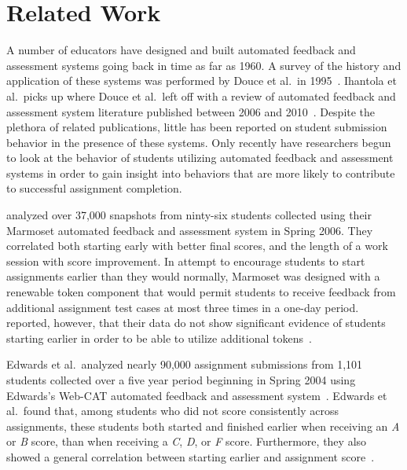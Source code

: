 \section{Related Work}

A number of educators have designed and built automated feedback and assessment
systems going back in time as far as 1960. A survey of the history and
application of these systems was performed by Douce et al.\ in
1995~\cite{Douce:2005:ATA:1163405.1163409}. Ihantola et al.\ picks up where
Douce et al.\ left off with a review of automated feedback and assessment
system literature published between 2006 and
2010~\cite{Ihantola:2010:RRS:1930464.1930480}. Despite the plethora of related
publications, little has been reported on student submission behavior in the
presence of these systems. Only recently have researchers begun to look at the
behavior of students utilizing automated feedback and assessment systems in
order to gain insight into behaviors that are more likely to contribute to
successful assignment completion.

\spacco{} analyzed over 37,000 snapshots from ninty-six students collected
using their Marmoset automated feedback and assessment system in Spring
2006. They correlated both starting early with better final scores, and the
length of a work session with score improvement. In attempt to encourage
students to start assignments earlier than they would normally, Marmoset was
designed with a renewable token component that would permit students to receive
feedback from additional assignment test cases at most three times in a one-day
period. \spacco{} reported, however, that their data do not show significant
evidence of students starting earlier in order to be able to utilize additional
tokens~\cite{Spacco:2013:TIP:2462476.2465594, Spacco:2006:EMD:1140124.1140131}.

Edwards et al.\ analyzed nearly 90,000 assignment submissions from 1,101
students collected over a five year period beginning in Spring 2004 using
Edwards's Web-CAT automated feedback and assessment
system~\cite{Edwards:2003:RCS:949344.949390}. Edwards et al.\ found that, among
students who did not score consistently across assignments, these students both
started and finished earlier when receiving an \emph{A} or \emph{B} score, than
when receiving a \emph{C}, \emph{D}, or \emph{F} score. Furthermore, they also
showed a general correlation between starting earlier and assignment
score~\cite{Edwards:2009:CEI:1584322.1584325}.

